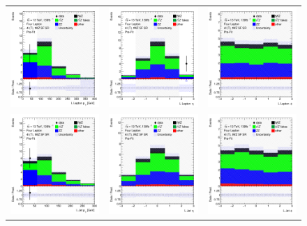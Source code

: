 \begin{figure}[htbp]
\begin{tabular}{ccc}
    \includegraphics[width=.25\textwidth]{figures/PreFitPlots/lep4_tWZ_4T_SF_L_lepton_pt.png} &
    \includegraphics[width=.25\textwidth]{figures/PreFitPlots/lep4_tWZ_4T_SF_L_lepton_eta.png} &
    \includegraphics[width=.25\textwidth]{figures/PreFitPlots/lep4_tWZ_4T_SF_L_lepton_phi.png} \\
    \includegraphics[width=.25\textwidth]{figures/PreFitPlots/lep4_tWZ_4T_SF_LJet_pt.png} &
    \includegraphics[width=.25\textwidth]{figures/PreFitPlots/lep4_tWZ_4T_SF_LJet_eta.png} &
    \includegraphics[width=.25\textwidth]{figures/PreFitPlots/lep4_tWZ_4T_SF_LJet_phi.png} \\


\end{tabular}
\end{figure}
